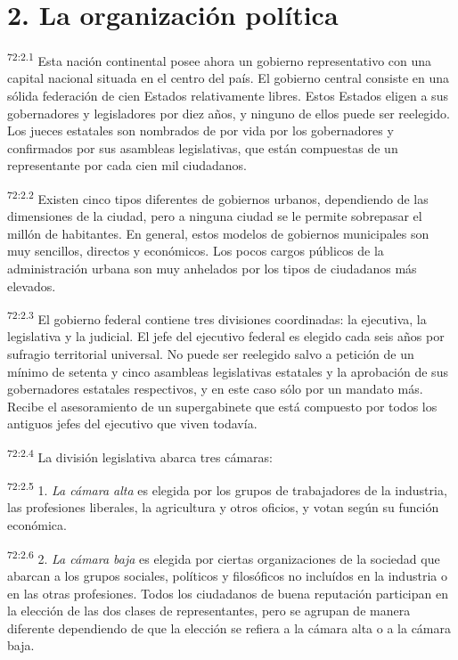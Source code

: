 \documentclass[twoside, 11pt]{book}
\begin{document}
\section*{2. La organización política}
\par
\textsuperscript{72:2.1} Esta nación continental posee ahora un gobierno representativo con una capital nacional situada en el centro del país. El gobierno central consiste en una sólida federación de cien Estados relativamente libres. Estos Estados eligen a sus gobernadores y legisladores por diez años, y ninguno de ellos puede ser reelegido. Los jueces estatales son nombrados de por vida por los gobernadores y confirmados por sus asambleas legislativas, que están compuestas de un representante por cada cien mil ciudadanos.

\par
\textsuperscript{72:2.2} Existen cinco tipos diferentes de gobiernos urbanos, dependiendo de las dimensiones de la ciudad, pero a ninguna ciudad se le permite sobrepasar el millón de habitantes. En general, estos modelos de gobiernos municipales son muy sencillos, directos y económicos. Los pocos cargos públicos de la administración urbana son muy anhelados por los tipos de ciudadanos más elevados.

\par
\textsuperscript{72:2.3} El gobierno federal contiene tres divisiones coordinadas: la ejecutiva, la legislativa y la judicial. El jefe del ejecutivo federal es elegido cada seis años por sufragio territorial universal. No puede ser reelegido salvo a petición de un mínimo de setenta y cinco asambleas legislativas estatales y la aprobación de sus gobernadores estatales respectivos, y en este caso sólo por un mandato más. Recibe el asesoramiento de un supergabinete que está compuesto por todos los antiguos jefes del ejecutivo que viven todavía.

\par
\textsuperscript{72:2.4} La división legislativa abarca tres cámaras:

\par
\textsuperscript{72:2.5} 1. \textit{La cámara alta} es elegida por los grupos de trabajadores de la industria, las profesiones liberales, la agricultura y otros oficios, y votan según su función económica.

\par
\textsuperscript{72:2.6} 2. \textit{La cámara baja} es elegida por ciertas organizaciones de la sociedad que abarcan a los grupos sociales, políticos y filosóficos no incluídos en la industria o en las otras profesiones. Todos los ciudadanos de buena reputación participan en la elección de las dos clases de representantes, pero se agrupan de manera diferente dependiendo de que la elección se refiera a la cámara alta o a la cámara baja.
\end{document}
